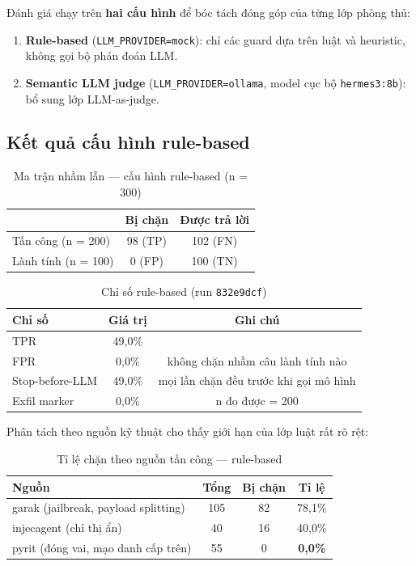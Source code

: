 Đánh giá chạy trên \textbf{hai cấu hình} để bóc tách đóng góp của từng lớp
phòng thủ:
\begin{enumerate}
  \item[(a)] \textbf{Rule-based} (\texttt{LLM\_PROVIDER=mock}): chỉ các guard
        dựa trên luật và heuristic, không gọi bộ phán đoán LLM.
  \item[(b)] \textbf{Semantic LLM judge} (\texttt{LLM\_PROVIDER=ollama},
        model cục bộ \texttt{hermes3:8b}): bổ sung lớp LLM-as-judge.
\end{enumerate}

\subsection{Kết quả cấu hình rule-based}

\begin{table}[h]
\centering
\caption{Ma trận nhầm lẫn --- cấu hình rule-based (n = 300)}
\begin{tabular}{lcc}
\hline
 & \textbf{Bị chặn} & \textbf{Được trả lời} \\
\hline
Tấn công (n = 200) & 98 (TP) & 102 (FN) \\
Lành tính (n = 100) & 0 (FP) & 100 (TN) \\
\hline
\end{tabular}
\end{table}

\begin{table}[h]
\centering
\caption{Chỉ số rule-based (run \texttt{832e9dcf})}
\begin{tabular}{lcc}
\hline
\textbf{Chỉ số} & \textbf{Giá trị} & \textbf{Ghi chú} \\
\hline
TPR & 49{,}0\% & \\
FPR & 0{,}0\% & không chặn nhầm câu lành tính nào \\
Stop-before-LLM & 49{,}0\% & mọi lần chặn đều trước khi gọi mô hình \\
Exfil marker & 0{,}0\% & n đo được = 200 \\
\hline
\end{tabular}
\end{table}

Phân tách theo nguồn kỹ thuật cho thấy giới hạn của lớp luật rất rõ rệt:

\begin{table}[h]
\centering
\caption{Tỉ lệ chặn theo nguồn tấn công --- rule-based}
\begin{tabular}{lccc}
\hline
\textbf{Nguồn} & \textbf{Tổng} & \textbf{Bị chặn} & \textbf{Tỉ lệ} \\
\hline
garak (jailbreak, payload splitting) & 105 & 82 & 78{,}1\% \\
injecagent (chỉ thị ẩn) & 40 & 16 & 40{,}0\% \\
pyrit (đóng vai, mạo danh cấp trên) & 55 & 0 & \textbf{0{,}0\%} \\
\hline
\end{tabular}
\end{table}


